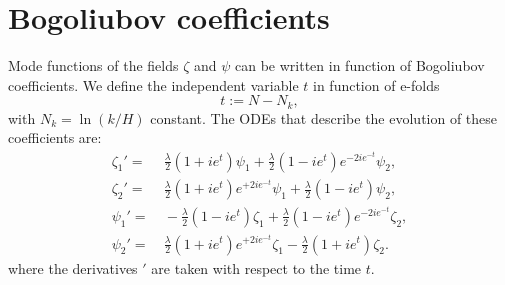 \documentclass[%
 aip,
 jmp,%
 amsmath,amssymb,
 reprint,%
]{revtex4-2}
\begin{document}
\section{Bogoliubov coefficients}

Mode functions of the fields $\zeta$ and $\psi$ can be written in function of Bogoliubov coefficients. We define the independent variable $t$ in function of e-folds
\begin{equation*}
    t:=N-N_k,
\end{equation*}
with  $N_k=\ln{(k/H)}$ constant. The ODEs that describe the evolution of these coefficients are:
\begin{equation}\label{Bogo}
\begin{aligned}
    \zeta_1'= &~{} \frac{\lambda}{2}\left(1+i e^{t}\right)\psi_1 + \frac{\lambda}{2}\left(1-i e^{t}\right)e^{-2i e^{-t}}\psi_2, \\
    \zeta_2'= &~{}  \frac{\lambda}{2}\left(1+i e^{t}\right)e^{+2i e^{-t}}\psi_1 + \frac{\lambda}{2}\left(1-i e^{t}\right)\psi_2, \\
    \psi_1'= &~{}  -\frac{\lambda}{2}\left(1-i e^{t}\right)\zeta_1 + \frac{\lambda}{2}\left(1-i e^{t}\right)e^{-2i e^{-t}}\zeta_2, \\
    \psi_2'=&~{}  \frac{\lambda}{2}\left(1+i e^{t}\right)e^{+2i e^{-t}}\zeta_1 - \frac{\lambda}{2}\left(1+i e^{t}\right)\zeta_2.
\end{aligned}
\end{equation}
where the derivatives $'$ are taken with respect to the time $t$.
\end{document}
